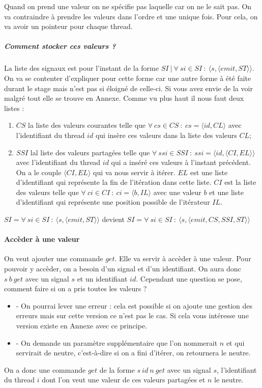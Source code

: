 \documentclass[10pt,a4paper]{report}
\begin{document}
Quand on prend une valeur on ne spécifie pas laquelle car on ne le sait pas. On va contraindre à prendre les valeurs dans l'ordre et une unique fois. Pour cela, on va avoir un pointeur pour chaque thread. 

\subparagraph{Comment stocker ces valeurs ?} 
La liste des signaux est pour l'instant de la forme $SI~|~\forall~si \in SI~:~\langle s,\langle emit,ST \rangle\rangle$. On va se contenter d'expliquer pour cette forme car une autre forme à été faite durant le stage mais n'est pas si éloigné de celle-ci. Si vous avez envie de la voir malgré tout elle se trouve en Annexe. Comme vu plus haut il nous faut deux listes : 
\smallbreak
\begin{enumerate}
\item $CS$ la liste des valeurs courantes telle que $\forall~cs \in CS~:~cs = \langle id , CL \rangle$ avec l'identifiant du thread $id$ qui insère ces valeurs dans la liste des valeurs $CL$;
\item $SSI$ lal liste des valeurs partagées telle que $\forall~ssi \in SSI~:~ssi = \langle id,\langle CI,EL\rangle\rangle$ avec l'identifiant du thread $id$ qui a inséré ces valeurs à l'instant précédent. On a le couple $\langle CI,EL\rangle$ qui va nous servir à itérer. $EL$ est une liste d'identifiant qui représente la fin de l'itération dans cette liste. $CI$ est la liste des valeurs telle que $\forall~ci \in CI~:~ci = \langle b,IL\rangle$ avec une valeur $b$ et une liste d'identifiant qui représente une position possible de l'itérateur $IL$.
\end{enumerate}
\medbreak

$SI = \forall~si \in SI~:~\langle s,\langle emit,ST \rangle\rangle$ devient $SI = \forall~si \in SI~:~\langle s,\langle emit,CS,SSI,ST \rangle\rangle$
\bigbreak


\paragraph{Accèder à une valeur}

On veut ajouter une commande $get$. Elle va servir à accèder à une valeur. Pour pouvoir y accèder, on a besoin d'un signal et d'un identifiant. On aura donc $s~b~get$ avec un signal $s$ et un identifiant $id$. Cependant une question se pose, comment faire si on a pris toutes les valeurs ? 
\smallbreak
\begin{itemize}
\item[] - On pourrai lever une erreur : cela est possible si on ajoute une gestion des erreurs mais sur cette version ce n'est pas le cas. Si cela vous intéresse une version existe en Annexe avec ce principe.
\item[] - On demande un paramètre supplémentaire que l'on nommerait $n$  et qui servirait de neutre, c'est-à-dire si on a fini d'itérer, on retournera le neutre.
\end{itemize} 
\smallbreak
On a donc une commande $get$ de la forme $s~id~n~get$ avec un signal $s$, l'identifiant du thread $i$  dont l'on veut une valeur de ces valeurs partagées et $n$ le neutre. 
\bigbreak
\end{document}
